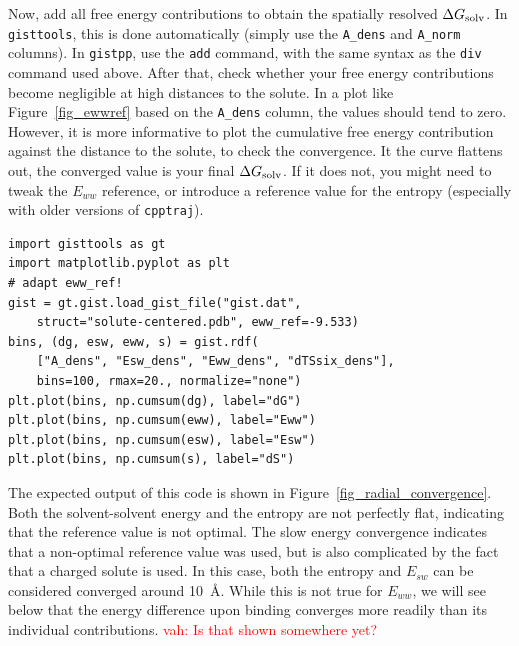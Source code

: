 \documentclass[9pt,tutorial]{livecoms}
\newcommand{\dgsolv}{\Delta G_\textup{solv}}
\newcommand{\software}{\texttt}
\newcommand{\todo}{\textcolor{red}}
\newcommand\inlinecode{\texttt}
\begin{document}
Now, add all free energy contributions to obtain the spatially resolved $\dgsolv$.
In \software{gisttools}, this is done automatically (simply use the \inlinecode{A\_dens} and \inlinecode{A\_norm} columns).
In \software{gistpp}, use the \inlinecode{add} command, with the same syntax as the \inlinecode{div} command used above.
After that, check whether your free energy contributions become negligible at high distances to the solute.
In a plot like Figure~\ref{fig_ewwref} based on the \inlinecode{A\_dens} column, the values should tend to zero.
However, it is more informative to plot the cumulative free energy contribution against the distance to the solute, to check the convergence.
It the curve flattens out, the converged value is your final $\dgsolv$\@.
If it does not, you might need to tweak the $E_{ww}$ reference, or introduce a reference value for the entropy (especially with older versions of \software{cpptraj}).

\begin{lstlisting}[style=python]
import gisttools as gt
import matplotlib.pyplot as plt
# adapt eww_ref!
gist = gt.gist.load_gist_file("gist.dat",
    struct="solute-centered.pdb", eww_ref=-9.533)
bins, (dg, esw, eww, s) = gist.rdf(
    ["A_dens", "Esw_dens", "Eww_dens", "dTSsix_dens"],
    bins=100, rmax=20., normalize="none")
plt.plot(bins, np.cumsum(dg), label="dG")
plt.plot(bins, np.cumsum(eww), label="Eww")
plt.plot(bins, np.cumsum(esw), label="Esw")
plt.plot(bins, np.cumsum(s), label="dS")
\end{lstlisting}

The expected output of this code is shown in Figure~\ref{fig_radial_convergence}.
Both the solvent-solvent energy and the entropy are not perfectly flat, indicating that the reference value is not optimal.
The slow energy convergence indicates that a non-optimal reference value was used, but is also complicated by the fact that a charged solute is used.
In this case, both the entropy and $E_{sw}$ can be considered converged around \SI{10}{\angstrom}.
While this is not true for $E_{ww}$, we will see below that the energy difference upon binding converges more readily than its individual contributions.
\todo{vah: Is that shown somewhere yet?}
\end{document}
